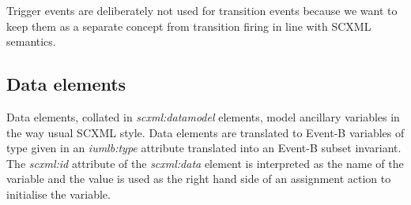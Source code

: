 Trigger events are deliberately not used for transition events because we 
want to keep them as a separate concept from transition firing in line 
with SCXML semantics.

\subsection{Data elements}
Data elements, collated in \emph{scxml:datamodel} elements, model ancillary 
variables in the way usual SCXML style. Data elements are translated to 
Event-B variables of type given in an \emph{iumlb:type} attribute translated 
into an Event-B subset invariant.  The \emph{scxml:id} attribute of the 
\emph{scxml:data} element is interpreted as the name of the variable and 
the value is used as the right hand side of an assignment action to initialise 
the variable.  



